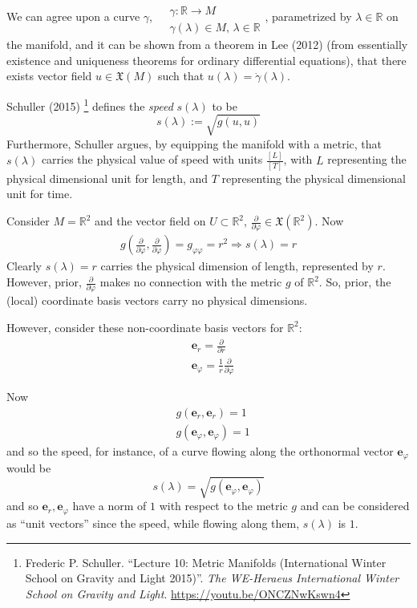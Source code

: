 \documentclass[10pt, twoside]{amsart}
\begin{document}
\begin{multicols*}{2}
We can agree upon a curve $\gamma$, $\begin{aligned} & \quad \\
  & \gamma:\mathbb{R} \to M \\
  & \gamma(\lambda) \in M, \, \lambda \in \mathbb{R} \end{aligned}$, parametrized by $\lambda \in \mathbb{R}$ on the manifold, and it can be shown from a theorem in Lee (2012) \cite{JMLee2012} (from essentially existence and uniqueness theorems for ordinary differential equations), that there exists vector field $u\in\mathfrak{X}(M)$ such that $u(\lambda) = \dot{\gamma}(\lambda)$.  

Schuller (2015) \footnote{Frederic P. Schuller. ``Lecture 10: Metric Manifolds (International Winter School on Gravity and Light 2015)''.  \emph{The WE-Heraeus International Winter School on Gravity and Light}. \url{https://youtu.be/ONCZNwKswn4}} defines the \emph{speed} $s(\lambda)$ to be
\[
s(\lambda) := \sqrt{g(u,u)}
\]
Furthermore, Schuller argues, by equipping the manifold with a metric, that $s(\lambda)$ carries the physical value of speed with units $\frac{[L]}{[T]}$, with $L$ representing the physical dimensional unit for length, and $T$ representing the physical dimensional unit for time.  

Consider $M=\mathbb{R}^2$ and the vector field on $U \subset \mathbb{R}^2$, $\frac{\partial}{ \partial \varphi} \in \mathfrak{X}(\mathbb{R}^2)$.  Now
\[
\begin{gathered}
  g\left( \frac{ \partial }{ \partial \varphi}, \frac{ \partial }{ \partial \varphi } \right) = g_{\varphi \varphi } = r^2
  \Longrightarrow s(\lambda) =r 
\end{gathered}
\]
Clearly $s(\lambda)=r$ carries the physical dimension of length, represented by $r$.  However, prior, $\frac{ \partial }{ \partial \varphi}$ makes no connection with the metric $g$ of $\mathbb{R}^2$.  So, prior, the (local) coordinate basis vectors carry no physical dimensions.  

However, consider these non-coordinate basis vectors for $\mathbb{R}^2$:
\[
\begin{aligned}
  & \mathbf{e}_r = \frac{ \partial }{ \partial r } \\ 
  & \mathbf{e}_{\varphi} = \frac{1}{r} \frac{ \partial }{ \partial \varphi }
\end{aligned}
\]

Now 
\[
\begin{aligned}
  & g(\mathbf{e}_r,\mathbf{e}_r)  =1 \\ 
  & g(\mathbf{e}_{\varphi},\mathbf{e}_{\varphi}) = 1
\end{aligned}
\]
and so the speed, for instance, of a curve flowing along the orthonormal vector $\mathbf{e}_{\varphi}$ would be 
\[
s(\lambda) = \sqrt{ g(\mathbf{e}_{\varphi}, \mathbf{e}_{\varphi})}
\]
and so $\mathbf{e}_r, \mathbf{e}_{\varphi}$ have a norm of $1$ with respect to the metric $g$ and can be considered as ``unit vectors'' since the speed, while flowing along them, $s(\lambda)$ is $1$.  


\end{multicols*}
\end{document}
